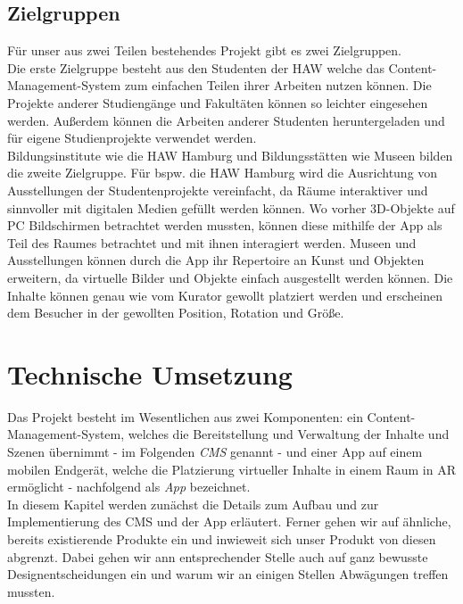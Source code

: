 \documentclass[titlepage, a4paper, 11pt]{scrartcl}
\begin{document}
    \subsection{Zielgruppen}
      Für unser aus zwei Teilen bestehendes Projekt gibt es zwei Zielgruppen.\\
      Die erste Zielgruppe besteht aus den Studenten der HAW welche das Content-Management-System zum einfachen Teilen ihrer Arbeiten nutzen können. 
      Die Projekte anderer Studiengänge und Fakultäten können so leichter eingesehen werden. Außerdem können die Arbeiten anderer Studenten heruntergeladen und für eigene Studienprojekte verwendet werden.\\

      Bildungsinstitute wie die HAW Hamburg und Bildungsstätten wie Museen bilden die zweite Zielgruppe. 
      Für bspw. die HAW Hamburg wird die Ausrichtung von Ausstellungen der Studentenprojekte vereinfacht, da Räume interaktiver und sinnvoller mit digitalen Medien gefüllt werden können. 
      Wo vorher 3D-Objekte auf PC Bildschirmen betrachtet werden mussten, können diese mithilfe der App als Teil des Raumes betrachtet und mit ihnen interagiert werden. 
      Museen und Ausstellungen können durch die App ihr Repertoire an Kunst und Objekten erweitern, da virtuelle Bilder und Objekte einfach ausgestellt werden können. 
      Die Inhalte können genau wie vom Kurator gewollt platziert werden und erscheinen dem Besucher in der gewollten Position, Rotation und Größe.

  \section{Technische Umsetzung}
  Das Projekt besteht im Wesentlichen aus zwei Komponenten: 
  ein Content-Management-System, welches die Bereitstellung und Verwaltung der Inhalte und Szenen übernimmt - im Folgenden \textit{CMS} genannt -
  und einer App auf einem mobilen Endgerät, welche die Platzierung virtueller Inhalte in einem Raum in AR ermöglicht - nachfolgend als \textit{App} bezeichnet.\\

  In diesem Kapitel werden zunächst die Details zum Aufbau und zur Implementierung des CMS und der App erläutert.
  Ferner gehen wir auf ähnliche, bereits existierende Produkte ein und inwieweit sich unser Produkt von diesen abgrenzt.
  Dabei gehen wir ann entsprechender Stelle auch auf ganz bewusste Designentscheidungen ein und warum wir an einigen Stellen Abwägungen treffen mussten.
  
\end{document}
